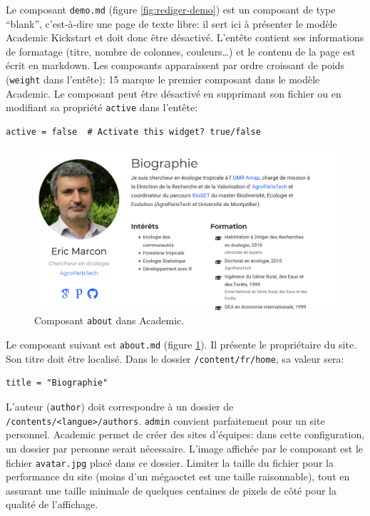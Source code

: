 \documentclass[
  12pt,
  french,
  a4paper,
  extrafontsizes,onecolumn,openright
  ]{memoir}
\newlength{\rf}
\begin{document}
\normalsize

Le composant \texttt{demo.md} (figure \ref{fig:rediger-demo}) est un composant de type \enquote{blank}, c'est-à-dire une page de texte libre: il sert ici à présenter le modèle Academic Kickstart et doit donc être désactivé.
L'entête contient ses informations de formatage (titre, nombre de colonnes, couleurs\ldots) et le contenu de la page est écrit en markdown.
Les composants apparaissent par ordre croissant de poids (\texttt{weight} dans l'entête): 15 marque le premier composant dans le modèle Academic.
Le composant peut être désactivé en supprimant son fichier ou en modifiant sa propriété \texttt{active} dans l'entête:

\begin{verbatim}
active = false  # Activate this widget? true/false
\end{verbatim}



\scriptsize

\begin{figure}

{\centering \includegraphics[width=0.8\linewidth]{images/rediger-about} 

}

\caption{Composant \texttt{about} dans Academic.}\label{fig:rediger-about}
\end{figure}

\normalsize

Le composant suivant est \texttt{about.md} (figure \ref{fig:rediger-about}).
Il présente le propriétaire du site.
Son titre doit être localisé.
Dans le dossier \texttt{/content/fr/home}, sa valeur sera:

\begin{verbatim}
title = "Biographie"
\end{verbatim}

L'auteur (\texttt{author}) doit correspondre à un dossier de \texttt{/contents/\textless{}langue\textgreater{}}\break\texttt{/authors}.
\texttt{admin} convient parfaitement pour un site personnel.
Academic permet de créer des sites d'équipes: dans cette configuration, un dossier par personne serait nécessaire.
L'image affichée par le composant est le fichier \texttt{avatar.jpg} placé dans ce dossier.
Limiter la taille du fichier pour la performance du site (moins d'un mégaoctet est une taille raisonnable), tout en assurant une taille minimale de quelques centaines de pixels de côté pour la qualité de l'affichage.
\end{document}
